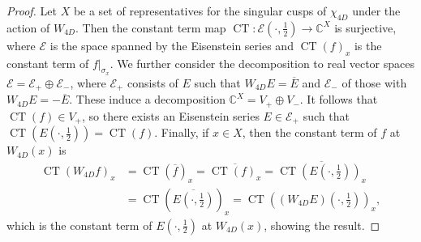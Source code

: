 \documentclass[11pt,reqno,oneside]{amsart}
\theoremstyle{plain}
\theoremstyle{definition}
\DeclareMathOperator{\CT}{CT}
\newcommand{\C}{\mathbb{C}}
\newcommand{\calE}{\mathcal{E}}
\begin{document}
\begin{proof}
  Let $X$ be a set of representatives for the singular cusps of $\chi_{4D}$ under the action of $W_{4D}$. Then the constant term map $\CT : \calE( \cdot, \tfrac{1}{2}) \to \C^{X}$ is surjective, where $\calE$ is the space spanned by the Eisenstein series and $\CT(f)_x$ is the constant term of $f \vert_{\sigma_x}$. We further consider the decomposition to real vector spaces $\calE = \calE_+ \oplus \calE_-$, where $\calE_+$ consists of $E$ such that $W_{4D} E = \overline{E}$ and $\calE_-$ of those with $W_{4D} E = - \overline{E}$. These induce a decomposition $\C^X = V_+ \oplus V_-$.
  It follows that $\CT(f) \in V_+$, so there exists an Eisenstein series $E \in \calE_+$ such that $\CT(E(\cdot, \tfrac{1}{2})) = \CT(f)$.
  Finally, if $x \in X$, then the constant term of $f$ at $W_{4D}(x)$ is
  \begin{align*}
    \CT(W_{4D} f)_{x} & = \CT(\overline{f})_{x} = \overline{\CT(f)_{x}} = \overline{\CT(E(\cdot, \tfrac{1}{2}))_{x}} \\
                      & = \CT(\overline{E(\cdot, \tfrac{1}{2})})_{x} = \CT((W_{4D} E)(\cdot, \tfrac{1}{2}))_{x},
  \end{align*}
  which is the constant term of $E(\cdot, \tfrac{1}{2})$ at $W_{4D}(x)$, showing the result.
\end{proof}
\end{document}
